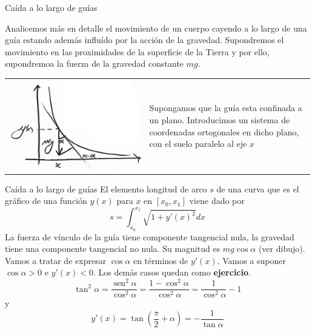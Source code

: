 \documentclass[handout,hyperref={colorlinks=true}]{beamer}
\DeclareMathOperator{\sen}{sen}
\begin{document}
\begin{frame}{Caída a lo largo de guías}

Analicemos más en detalle el movimiento de un cuerpo cayendo a lo largo de una guía estando además influído  por la acción de la gravedad. Supondremos el movimiento
en las proximidades de la superficie de la Tierra y por ello, supondremoa la fuerza de la gravedad constante $mg$. 
\begin{tabular}{m{5cm} m{4.5cm}}
 \includegraphics[scale=.07]{imagenes/caida_guia.jpg} & Supongamos que la guía esta
confinada a un plano. Introducimos un sistema de coordenadas ortogonales en dicho plano, con el suelo paralelo al eje $x$
\end{tabular}



\end{frame}


\begin{frame}{Caída a lo largo de guías}
El elemento longitud de arco $s$ de una curva que es el gráfico de una función $y(x)$ para $x$ en $[x_0,x_1]$ viene dado por 
\[s=\int_{x_0}^{x_1}\sqrt{1+y'(x)^2}dx\]
La fuerza de vínculo de la guía tiene componente tangencial nula,  la gravedad tiene una componente tangencial no nula. 
Su magnitud es $mg\cos\alpha$ (ver dibujo). Vamos a tratar de expresar $\cos\alpha$  en términos de   $y'(x)$. Vamos a suponer $\cos\alpha>0$ e $y'(x)<0$. 
Los demás casos quedan como \textbf{ejercicio}.
\[ \tan^2\alpha=\frac{\sen^2\alpha}{\cos^2\alpha}=\frac{1-\cos^2\alpha}{\cos^2\alpha}=\frac{1}{\cos^2\alpha}-1\]
y
\[y'(x)=\tan \left(\frac{\pi}{2}+\alpha\right)=-\frac{1}{\tan\alpha}\]

 

\end{frame}
\end{document}
